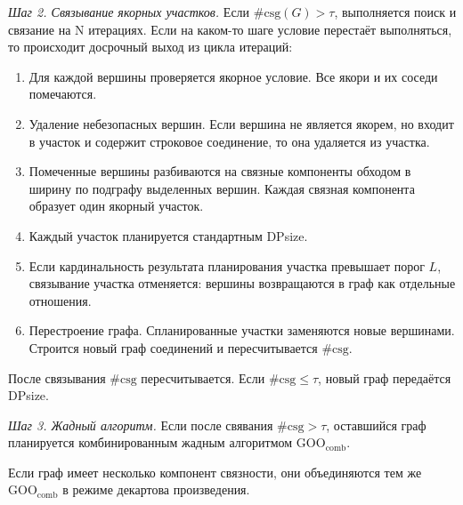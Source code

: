 \textit{Шаг 2. Связывание якорных участков.}
Если $\#\mathrm{csg}(G) > \tau$, выполняется поиск и связание на N итерациях. Если на каком-то шаге условие 
перестаёт выполняться, то происходит досрочный выход из цикла итераций:
\begin{enumerate}
    \item Для каждой вершины проверяется якорное условие.
    Все якори и их соседи помечаются.
    \item Удаление небезопасных вершин. Если вершина не является якорем, но входит в участок и содержит строковое 
    соединение, то она удаляется из участка.
    \item Помеченные вершины разбиваются
    на связные компоненты обходом в ширину по подграфу выделенных
    вершин. Каждая связная компонента образует один якорный участок.
    \item Каждый участок планируется стандартным DPsize.
    \item Если кардинальность результата планирования участка
    превышает порог $L$, связывание участка отменяется: вершины возвращаются в граф как
    отдельные отношения.
    \item Перестроение графа. Спланированные участки заменяются
    новые вершинами. Строится новый граф соединений
    и пересчитывается $\#\mathrm{csg}$.
\end{enumerate}

После связывания $\#\mathrm{csg}$ пересчитывается.
Если $\#\mathrm{csg} \leqslant \tau$, новый граф передаётся DPsize.
\par

\textit{Шаг 3. Жадный алгоритм.}
Если после свявания $\#\mathrm{csg} > \tau$, оставшийся граф
планируется комбинированным жадным алгоритмом $\mathrm{GOO_{comb}}$.
\par

Если граф имеет несколько компонент связности,
они объединяются тем же $\mathrm{GOO_{comb}}$ в режиме
декартова произведения.
\par

\newpage

